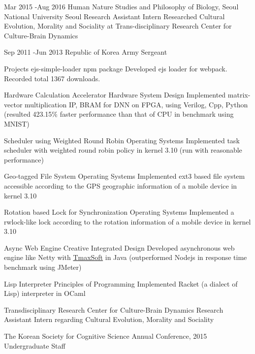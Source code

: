 \documentclass[10pt]{article} %
\begin{document}
\if{}
\job
{Mar 2015 -}{Aug 2016}
{Human Nature Studies and Philosophy of Biology, Seoul National University}
{Seoul}
{}
{Research Assistant Intern}
{Researched Cultural Evolution, Morality and Sociality at Trans-disciplinary Research Center for Culture-Brain Dynamics}

\jobnocontent
{Sep 2011 -}{Jun 2013}
{Republic of Korea Army}
{}
{}
{Sergeant}
\fi


\project
{Projects}
{ejs-simple-loader}
{npm package}
{
Developed ejs loader for webpack. Recorded total 1367 downloads.}

\project
{}
{Hardware Calculation Accelerator}
{Hardware System Design}
{Implemented matrix-vector multiplication IP, BRAM for DNN on FPGA, using Verilog, Cpp, Python (resulted 423.15\% faster performance than that of CPU in benchmark using MNIST)}

\project
{}
{Scheduler using Weighted Round Robin}
{Operating Systems}
{Implemented task scheduler with weighted round robin policy in kernel 3.10 (run with reasonable performance)}

\if{}
\project
{}
{Geo-tagged File System}
{Operating Systems}
{Implemented ext3 based file system accessible according to the GPS geographic information of a mobile device in kernel 3.10}

\project
{}
{Rotation based Lock for Synchronization}
{Operating Systems}
{Implemented a rwlock-like lock according to the rotation information of a mobile device in kernel 3.10}
\fi

\if{}
\project
{}
{Async Web Engine}
{Creative Integrated Design}
{Developed asynchronous web engine like Netty with \href{https://kr.tmaxsoft.com/main.do}{TmaxSoft} in Java (outperformed Nodejs in response time benchmark using JMeter)}

\project
{}
{Lisp Interpreter}
{Principles of Programming}
{Implemented Racket (a dialect of Lisp) interpreter in OCaml}
\fi

\if{}
\project
{}
{Transdisciplinary Research Center for Culture-Brain Dynamics}
{Research Assistant Intern}
{regarding Cultural Evolution, Morality and Sociality}

\project
{}
{The Korean Society for Cognitive Science Annual Conference, 2015}
{Undergraduate Staff}
{}
\fi

\end{document}
